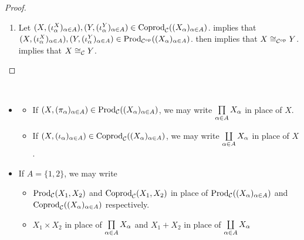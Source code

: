 \documentclass{book}
\begin{document}
\begin{proof}
\begin{enumerate}
\begin{itemize}
\[\begin{tikzcd}[baseline= 7]
					& X_{\al}   
				\end{tikzcd}
				\] 
				Uniqueness of $\phi$ then implies that
				\begin{align*}
					\phi_{X,Y} \circ_{\MC} \phi_{Y,X}
					& = \phi \\
					& = \id_Y^{\MC},
				\end{align*} 
				\item Similarly, $\phi_{Y,X} \circ_{\MC} \phi_{X,Y} = \id_X^{\MC}$. 
			\end{itemize}
			Hence $\phi_{Y,X} \in \Iso_{\MC}(Y,X)$ and $X \cong_{\MC} Y$. Since $(X, (\pi^X_{\al})_{\al \in A}), (Y, (\pi^Y_{\al})_{\al \in A}) \in \Prod_{\MC}((X_{\al})_{\al \in A})$ are arbitrary, we have that for each $(X, (\pi^X_{\al})_{\al \in A}), (Y, (\pi^Y_{\al})_{\al \in A}) \in \Prod_{\MC}((X_{\al})_{\al \in A})$, $X \cong_{\MC} Y$.
			\item Let $(X, (\iota^X_{\alpha})_{\alpha \in A}), (Y, (\iota^Y_{\alpha})_{\alpha \in A}) \in \operatorname{Coprod}_{\mathcal{C}}((X_{\alpha})_{\alpha \in A})$.  implies that $(X, (\iota^X_{\alpha})_{\alpha \in A}), (Y, (\iota^Y_{\alpha})_{\alpha \in A}) \in \operatorname{Prod}_{{\mathcal{C}}^{\text{op}}}((X_{\alpha})_{\alpha \in A})$.  then implies that $X \cong_{{\mathcal{C}}^{\text{op}}} Y$.  implies that $X \cong_{\MC} Y$.
		\end{enumerate}
	\end{proof}
	
	\begin{note}\
		\begin{itemize}
			\item 
			\begin{itemize}
				\item If $(X, (\pi_{\alpha})_{\alpha \in A}) \in \operatorname{Prod}_{\mathcal{C}}((X_{\alpha})_{\alpha \in A})$, we may write $\prod\limits_{\alpha \in A} X_{\alpha}$ in place of $X$.
				\item If $(X, (\iota_{\alpha})_{\alpha \in A}) \in \operatorname{Coprod}_{\mathcal{C}}((X_{\alpha})_{\alpha \in A})$, we may write $\coprod\limits_{\alpha \in A} X_{\alpha}$ in place of $X$.
			\end{itemize}
			\item If $A = \{1,2\}$, we may write 
			\begin{itemize}
				\item $\operatorname{Prod}_{\mathcal{C}}(X_1, X_2)$ and $\operatorname{Coprod}_{\mathcal{C}}(X_1, X_2)$ in place of $\operatorname{Prod}_{\mathcal{C}}((X_{\alpha})_{\alpha \in A})$ and $\operatorname{Coprod}_{\mathcal{C}}((X_{\alpha})_{\alpha \in A})$ respectively. 
				\item $X_1 \times X_2$ in place of $\prod\limits_{\alpha \in A} X_{\alpha}$ and $X_1 + X_2$ in place of $\coprod\limits_{\alpha \in A} X_{\alpha}$
			\end{itemize}
		\end{itemize}
	\end{note}
	
\end{document}
